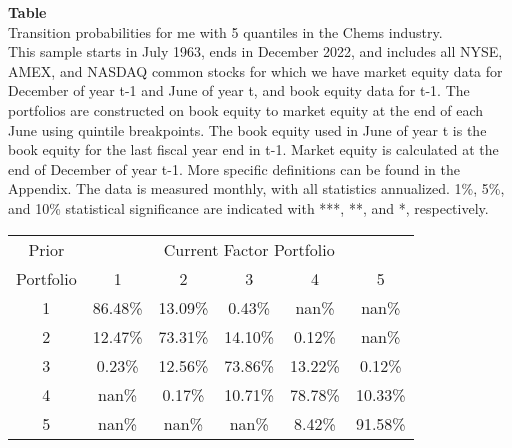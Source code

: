 \begin{table*}[ht!]
\raggedright
{}
\label{tab: transition_probs_me_Chems_with_5_quantiles}
\textbf{Table \thetable} \\
Transition probabilities for me with 5 quantiles in the Chems industry. \\
\hspace*{1em}This sample starts in July 1963, ends in December 2022, and includes all NYSE, AMEX, and NASDAQ common stocks for which we have market equity data for December of year t-1 and June of year t, and book equity data for t-1. The portfolios are constructed on book equity to market equity at the end of each June using quintile breakpoints.  The book equity used in June of year t is the book equity for the last fiscal year end in t-1.  Market equity is calculated at the end of December of year t-1.  More specific definitions can be found in the Appendix.  The data is measured monthly, with all statistics annualized.  1\%, 5\%, and 10\% statistical significance are indicated with ***, **, and *, respectively. \\
\vspace{0.5em}
\centering
\begin{adjustbox}{max width=\textwidth}
\begin{tabular}{@{}cccccc@{}}
\toprule
Prior & \multicolumn{5}{c}{Current Factor Portfolio} \\
Portfolio & 1 & 2 & 3 & 4 & 5 \\
\midrule
1 & 86.48\% & 13.09\% & 0.43\% & nan\% & nan\% \\
2 & 12.47\% & 73.31\% & 14.10\% & 0.12\% & nan\% \\
3 & 0.23\% & 12.56\% & 73.86\% & 13.22\% & 0.12\% \\
4 & nan\% & 0.17\% & 10.71\% & 78.78\% & 10.33\% \\
5 & nan\% & nan\% & nan\% & 8.42\% & 91.58\% \\
\bottomrule
\end{tabular}
\end{adjustbox}
\end{table*}